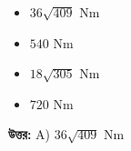 \documentclass[12pt, a4paper]{article}
\begin{document}
\begin{itemize}[label={}, leftmargin=1cm, itemsep=0.5em]
    \item[\textbf{A)}] $36\sqrt{409}\text{ Nm}$
    \item[\textbf{B)}] $540\text{ Nm}$
    \item[\textbf{C)}] $18\sqrt{305}\text{ Nm}$
    \item[\textbf{D)}] $720\text{ Nm}$
\end{itemize}

\vspace{0.5em}
\begin{tcolorbox}[answerbox]
    \textbf{\color{success} উত্তর:} A)  $36\sqrt{409}\text{ Nm}$
\end{tcolorbox}
\vspace{1em}
\end{document}
